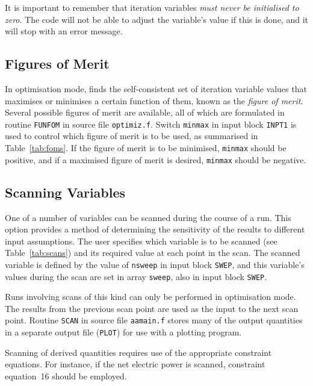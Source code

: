 It is important to remember that iteration variables {\em must never be
initialised to zero}. The code will not be able to adjust the variable's value
if this is done, and it will stop with an error message.


\subsection{Figures of Merit}
\label{sec:foms}

In optimisation mode, \PS finds the self-consistent set of iteration variable
values that maximises or minimises a certain function of them, known as the
{\em figure of merit}. Several possible figures of merit are available, all of
which are formulated in routine {\tt FUNFOM} in source file {\tt optimiz.f}.
Switch {\tt minmax} in input block {\tt INPT1} is used to control which figure
of merit is to be used, as summarised in Table~\ref{tab:foms}. If the figure
of merit is to be minimised, {\tt minmax} should be positive, and if a
maximised figure of merit is desired, {\tt minmax} should be negative.


\subsection{Scanning Variables}
\label{sec:scans}

One of a number of variables can be scanned during the course of a \PS run.
This option provides a method of determining the sensitivity of the results to
different input assumptions. The user specifies which variable is to be
scanned (see Table~\ref{tab:scans}) and its required value at each point in
the scan. The scanned variable is defined by the value of {\tt nsweep} in
input block {\tt SWEP}, and this variable's values during the scan are set in
array {\tt sweep}, also in input block {\tt SWEP}.

Runs involving scans of this kind can only be performed in optimisation mode.
The results from the previous scan point are used as the input to the next
scan point. Routine {\tt SCAN} in source file {\tt aamain.f} stores many of
the output quantities in a separate output file (\texttt{PLOT}) for use with a
plotting program.

Scanning of derived quantities requires use of the appropriate constraint
equations. For instance, if the net electric power is scanned, constraint
equation~16 should be employed.

